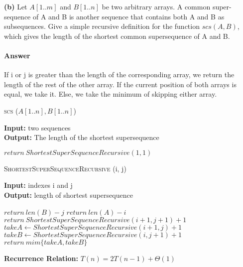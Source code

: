 \documentclass{article}
\begin{document}
{\bf (b)} Let $A[1.. m]$ and $B[1.. n]$ be two arbitrary arrays. A common super-
sequence of A and B is another sequence that contains both A and B
as subsequences. Give a simple recursive definition for the function
$scs(A, B)$, which gives the length of the shortest common supersequence
of A and B.

\paragraph{Answer}

If i or j is greater than the length of the corresponding array, we return the
length of the rest of the other array. If the current position of both arrays is
equal, we take it. Else, we take the minimum of skipping either array.

\begin{algorithm} \caption{\textsc{scs} ($A[1..n], B[1..n]$)}\label{alg:seb}
    {\bf Input:} two sequences\\
    {\bf Output:} The length of the shortest supersequence
    \begin{algorithmic}[1]
        \State$return\ ShortestSuperSequenceRecursive(1, 1)$
    \end{algorithmic}
\end{algorithm}

\begin{algorithm} \caption{\textsc{ShortestSuperSequenceRecursive} (i, j)}\label{alg:seb}
    {\bf Input:} indexes i and j\\
    {\bf Output:} length of shortest supersequence
    \begin{algorithmic}[1]
            \State$return\ len(B) - j$
            \State$return\ len(A) - i$
            \State$return\ ShortestSuperSequenceRecursive(i+1, j+1) +1$
        \EndIf{}
        \State$takeA \gets ShortestSuperSequenceRecursive(i+1, j) +1$
        \State$takeB \gets ShortestSuperSequenceRecursive(i, j+1) +1$
        \State$return\ mim\{takeA, takeB\}$
    \end{algorithmic}
\end{algorithm}

{\bf Recurrence Relation: } $T(n) = 2T(n-1) + \Theta(1)$

\todo{}


\end{document}
